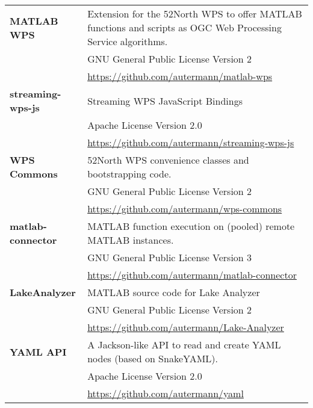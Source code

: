 \documentclass[english,
               paper=a4,
               fontsize=11pt,
               bibliography=totoc,
               listof=nochaptergap,
               listof=notoc,
               numbers=noendperiod,
               parskip=half,
               footnotes=multiple,
               toc=numberline,
               captions=tableheading,
               DIV=9,
              ]{scrreprt}
\newcommand{\ftn}{52\textdegree{}North\xspace}
\begin{document}
\begin{appendix}
\begin{center}
\begin{small}
\begin{tabularx}{\linewidth}{@{}lX@{}}
            \textbf{MATLAB WPS}
            & Extension for the \ftn WPS to offer MATLAB functions and scripts as OGC Web Processing Service algorithms.\\
            & GNU General Public License Version 2\\
            & \url{https://github.com/autermann/matlab-wps}\\
            \cmidrule(r){1-1}
            \cmidrule(l){2-2}

            \textbf{streaming-wps-js}
            & Streaming WPS JavaScript Bindings\\
            & Apache License Version 2.0\\
            & \url{https://github.com/autermann/streaming-wps-js}\\
            \cmidrule(r){1-1}
            \cmidrule(l){2-2}

            \textbf{WPS Commons}
            & \ftn WPS convenience classes and bootstrapping code.\\
            & GNU General Public License Version 2\\
            & \url{https://github.com/autermann/wps-commons}\\
            \cmidrule(r){1-1}
            \cmidrule(l){2-2}

            \textbf{matlab-connector}
            & MATLAB function execution on (pooled) remote MATLAB instances.\\
            & GNU General Public License Version 3\\
            & \url{https://github.com/autermann/matlab-connector}\\
            \cmidrule(r){1-1}
            \cmidrule(l){2-2}

            \textbf{LakeAnalyzer}
            & MATLAB source code for Lake Analyzer\\
            & GNU General Public License Version 2\\
            & \url{https://github.com/autermann/Lake-Analyzer}\\
            \cmidrule(r){1-1}
            \cmidrule(l){2-2}

            \textbf{YAML API}
            & A Jackson-like API to read and create YAML nodes (based on SnakeYAML).\\
            & Apache License Version 2.0\\
            & \url{https://github.com/autermann/yaml}\\
            \bottomrule
          \end{tabularx}
        \end{small}
      \end{center}



\end{appendix}
\end{document}
